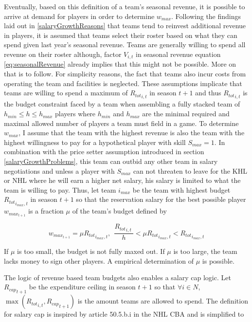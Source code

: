 \documentclass[12pt, a4paper]{article}
\begin{document}
\noindent
Eventually, based on this definition of a team's seasonal revenue, it is possible to arrive at demand for players in order to determine $w_{max}$. Following the findings laid out in \ref{salaryGrowthReasons} that teams tend to reinvest additional revenue in players, it is assumed that teams select their roster based on what they can spend given last year's seasonal revenue. Teams are generally willing to spend all revenue on their roster although, factor $V_{i,t}$ in seasonal revenue equation \ref{eq:seasonalRevenue} already implies that this might not be possible. More on that is to follow. For simplicity reasons, the fact that teams also incur costs from operating the team and facilities is neglected. These assumptions implicate that teams are willing to spend a maximum of ${R_{tot}}_{i,t}$ in season $t+1$ and thus ${R_{tot}}_{i,t}$ is the budget constraint faced by a team when assembling a fully stacked team of $h_{min} \leq h \leq h_{max}$ players where $h_{min}$ and $h_{max}$ are the minimal required and maximal allowed number of players a team must field in a game. To determine $w_{max}$, I assume that the team with the highest revenue is also the team with the highest willingness to pay for a hypothetical player with skill $S_{max}=1$. In combination with the price setter assumption introduced in section \ref{salaryGrowthProblems}, this team can outbid any other team in salary negotiations and unless a player with $S_{max}$ can not threaten to leave for the KHL or NHL where he will earn a higher net salary, his salary is limited to what the team is willing to pay. Thus, let team $i_{max}$ be the team with highest budget ${R_{tot}}_{i_{max},t}$ in season $t+1$ so that the reservation salary for the best possible player $w_{max_{t+1}}$ is a fraction $\mu$ of the team's budget defined by

\begin{equation}
{w_{max_{t+1}}=\mu{R_{tot}}_{i_{max},t},\ \ \frac{{R_{tot}}_{i,t}\ }{h}<\mu{R_{tot}}_{i_{max},t}<{R_{tot}}_{i_{max},t}}
\end{equation}

\noindent
If $\mu$ is too small, the budget is not fully maxed out. If $\mu$ is too large, the team lacks money to sign other players. A empirical determination of $\mu$ is possible.  

\noindent
The logic of revenue based team budgets also enables a salary cap logic. Let ${R_{cap}}_{t+1}$ be the expenditure ceiling in season $t+1$ so that $\forall i \in N$, $\max({R_{tot}}_{i,t}, {R_{cap}}_{t+1})$ is the amount teams are allowed to spend. The definition for salary cap is inspired by article 50.5.b.i in the NHL CBA \citep[][]{nhl_collective_2012} and is simplified to
\end{document}
